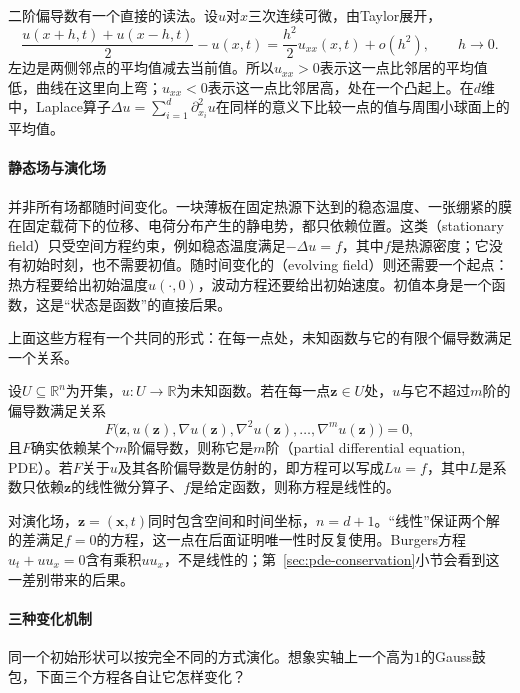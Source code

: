 二阶偏导数有一个直接的读法。设$u$对$x$三次连续可微，由Taylor展开，
\begin{equation}
  \frac{u(x+h,t)+u(x-h,t)}{2}-u(x,t)=\frac{h^2}{2}u_{xx}(x,t)+o(h^2),\qquad h\to0 .
  \label{eq:pde-neighbor-average}
\end{equation}
左边是两侧邻点的平均值减去当前值。所以$u_{xx}>0$表示这一点比邻居的平均值低，曲线在这里向上弯；$u_{xx}<0$表示这一点比邻居高，处在一个凸起上。在$d$维中，Laplace算子$\Delta u=\sum_{i=1}^d\partial_{x_i}^2u$在同样的意义下比较一点的值与周围小球面上的平均值。

\paragraph{静态场与演化场}
并非所有场都随时间变化。一块薄板在固定热源下达到的稳态温度、一张绷紧的膜在固定载荷下的位移、电荷分布产生的静电势，都只依赖位置。这类（stationary field）只受空间方程约束，例如稳态温度满足$-\Delta u=f$，其中$f$是热源密度；它没有初始时刻，也不需要初值。随时间变化的（evolving field）则还需要一个起点：热方程要给出初始温度$u(\cdot,0)$，波动方程还要给出初始速度。初值本身是一个函数，这是“状态是函数”的直接后果。

上面这些方程有一个共同的形式：在每一点处，未知函数与它的有限个偏导数满足一个关系。

\begin{definition}[偏微分方程]
\label{def:pde-pde}
设$U\subseteq\mathbb R^n$为开集，$u:U\to\mathbb R$为未知函数。若在每一点$\bm z\in U$处，$u$与它不超过$m$阶的偏导数满足关系
\[
  F\bigl(\bm z,u(\bm z),\nabla u(\bm z),\nabla^2u(\bm z),\ldots,\nabla^mu(\bm z)\bigr)=0,
\]
且$F$确实依赖某个$m$阶偏导数，则称它是$m$阶（partial differential equation, PDE）。若$F$关于$u$及其各阶偏导数是仿射的，即方程可以写成$Lu=f$，其中$L$是系数只依赖$\bm z$的线性微分算子、$f$是给定函数，则称方程是线性的。
\end{definition}

对演化场，$\bm z=(\bm x,t)$同时包含空间和时间坐标，$n=d+1$。“线性”保证两个解的差满足$f=0$的方程，这一点在后面证明唯一性时反复使用。Burgers方程$u_t+uu_x=0$含有乘积$uu_x$，不是线性的；第~\ref{sec:pde-conservation}小节会看到这一差别带来的后果。

\paragraph{三种变化机制}
同一个初始形状可以按完全不同的方式演化。想象实轴上一个高为$1$的Gauss鼓包，下面三个方程各自让它怎样变化？

